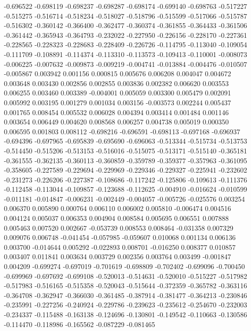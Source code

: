 -0.696522
-0.698119
-0.698237
-0.698287
-0.698174
-0.699140
-0.698763
-0.517227
-0.515275
-0.516714
-0.518234
-0.518027
-0.518796
-0.515599
-0.517066
-0.515787
-0.516302
-0.360142
-0.366400
-0.362477
-0.360374
-0.361855
-0.364433
-0.361506
-0.361442
-0.365943
-0.364793
-0.232022
-0.227950
-0.226156
-0.228170
-0.227361
-0.228565
-0.228323
-0.228683
-0.228409
-0.226726
-0.114795
-0.113040
-0.109054
-0.111709
-0.108891
-0.114374
-0.113310
-0.113573
-0.109413
-0.110001
-0.008073
-0.006225
-0.007632
-0.009873
-0.009219
-0.004741
-0.013884
-0.004476
-0.010507
-0.005867
0.003942
0.001156
0.000815
0.005676
0.006208
0.004047
0.004672
0.003648
0.003430
0.002856
0.002855
0.003836
0.002382
0.006620
0.003553
0.006255
0.003460
0.003389
-0.004001
0.005059
0.003300
0.005479
0.002091
0.005992
0.003195
0.001279
0.001034
0.003156
-0.003573
0.002244
0.005437
0.001765
0.008454
0.005532
0.006028
0.004394
0.003414
0.001484
0.001146
0.003654
0.006449
0.004620
0.008568
0.006257
0.004738
0.005019
0.000350
0.006595
0.001803
0.008112
-0.698216
-0.696591
-0.698113
-0.697168
-0.696937
-0.694396
-0.697965
-0.695839
-0.695690
-0.696063
-0.513344
-0.515734
-0.513753
-0.514450
-0.515206
-0.513153
-0.516016
-0.515075
-0.513171
-0.515140
-0.365181
-0.361555
-0.362135
-0.360113
-0.360859
-0.359789
-0.359377
-0.357963
-0.361095
-0.358605
-0.227589
-0.229694
-0.229969
-0.229346
-0.229327
-0.225941
-0.232602
-0.231273
-0.226206
-0.227387
-0.108686
-0.117242
-0.125806
-0.109613
-0.111376
-0.112458
-0.113044
-0.109857
-0.123688
-0.112625
-0.004910
-0.016624
-0.010599
-0.011181
-0.014847
-0.006231
-0.002449
-0.004057
-0.005726
-0.025576
0.003254
0.006370
0.005890
0.000764
0.006110
0.006002
0.005810
-0.006474
0.004516
0.004124
0.005037
0.006353
0.004904
0.008584
0.005695
0.006551
0.007888
0.005463
0.007520
0.002667
-0.053739
0.008553
0.008464
-0.031358
0.007329
0.009076
0.006748
-0.041454
-0.057985
-0.059607
0.010068
0.001134
0.006136
0.003700
-0.014644
0.005292
-0.022893
0.008701
-0.016250
0.008377
0.010857
0.003407
0.011841
0.003634
0.003729
0.002356
0.003764
0.003499
-0.001847
0.004209
-0.699274
-0.697019
-0.701619
-0.698809
-0.702402
-0.699096
-0.700450
-0.699969
-0.697692
-0.699108
-0.520013
-0.514631
-0.520010
-0.515227
-0.517982
-0.517983
-0.516165
-0.515358
-0.520043
-0.515644
-0.372359
-0.365782
-0.363116
-0.364708
-0.362947
-0.366030
-0.361485
-0.387914
-0.381477
-0.364213
-0.230846
-0.235991
-0.227256
-0.240924
-0.229786
-0.239623
-0.235612
-0.254670
-0.232003
-0.234337
-0.115488
-0.163138
-0.124696
-0.130801
-0.149542
-0.110663
-0.130586
-0.114470
-0.118986
-0.165562
-0.087229
-0.081465
